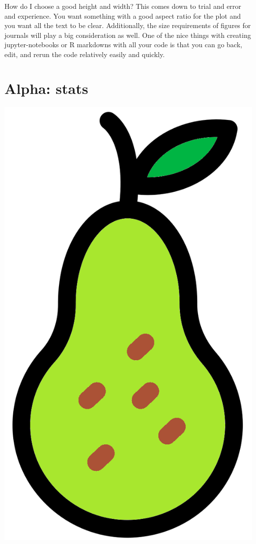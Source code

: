 \documentclass[
]{book}
\begin{document}
How do I choose a good height and width?
This comes down to trial and error and experience.
You want something with a good aspect ratio for the plot and you want all the text to be clear.
Additionally, the size requirements of figures for journals will play a big consideration as well.
One of the nice things with creating jupyter-notebooks or R markdowns with all your code is that you can go back, edit, and rerun the code relatively easily and quickly.

\hypertarget{alpha-stats}{%
\section{Alpha: stats}\label{alpha-stats}}

\includegraphics{figures/pear.png}
\end{document}

